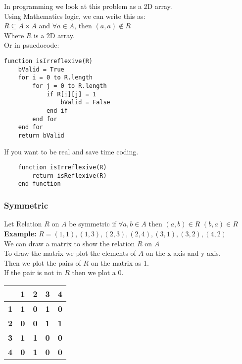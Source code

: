 In programming we look at this problem as a 2D array. \\
Using Mathematics logic, we can write this as: \\
$R \subseteq A \times A$ and $\forall a \in A$, then $(a,a) \notin R$ \\
Where $R$ is a 2D array. \\
Or in psuedocode: \\
\begin{lstlisting}
function isIrreflexive(R)
    bValid = True
    for i = 0 to R.length
        for j = 0 to R.length
            if R[i][j] = 1 
                bValid = False
            end if
        end for
    end for                    
    return bValid
\end{lstlisting}

If you want to be real and save time coding.
\begin{lstlisting}
    function isIrreflexive(R)
        return isReflexive(R)
    end function
\end{lstlisting}

\subsubsection{Symmetric}
Let Relation $R$ on $A$ be symmetric if $\forall a,b \in A$ then $(a,b) \in R$  $(b,a) \in R$ \\

\textbf{Example:}
$R ={(1,1),(1,3),(2,3),(2,4),(3,1),(3,2),(4,2)}$ \\
We can draw a matrix to show the relation $R$ on $A$ \\
To draw the matrix we plot the elements of $A$ on the x-axis and y-axis. \\
Then we plot the pairs of $R$ on the matrix as 1. \\
If the pair is not in $R$ then we plot a 0. \\

\begin{tabular}{|c|c|c|c|c|}
\hline
\multicolumn{1}{|c|}{\textbf{}} & \multicolumn{1}{c|}{\textbf{1}} & \multicolumn{1}{c|}{\textbf{2}} & \multicolumn{1}{c|}{\textbf{3}} & \multicolumn{1}{c|}{\textbf{4}} \\ \hline
\multicolumn{1}{|c|}{\textbf{1}} & \multicolumn{1}{c|}{\textbf{1}} & \multicolumn{1}{c|}{\textbf{0}} & \multicolumn{1}{c|}{\textbf{1}} & \multicolumn{1}{c|}{\textbf{0}} \\ \hline
\multicolumn{1}{|c|}{\textbf{2}} & \multicolumn{1}{c|}{\textbf{0}} & \multicolumn{1}{c|}{\textbf{0}} & \multicolumn{1}{c|}{\textbf{1}} & \multicolumn{1}{c|}{\textbf{1}} \\ \hline
\multicolumn{1}{|c|}{\textbf{3}} & \multicolumn{1}{c|}{\textbf{1}} & \multicolumn{1}{c|}{\textbf{1}} & \multicolumn{1}{c|}{\textbf{0}} & \multicolumn{1}{c|}{\textbf{0}} \\ \hline
\multicolumn{1}{|c|}{\textbf{4}} & \multicolumn{1}{c|}{\textbf{0}} & \multicolumn{1}{c|}{\textbf{1}} & \multicolumn{1}{c|}{\textbf{0}} & \multicolumn{1}{c|}{\textbf{0}} \\ \hline
\end{tabular} \\

